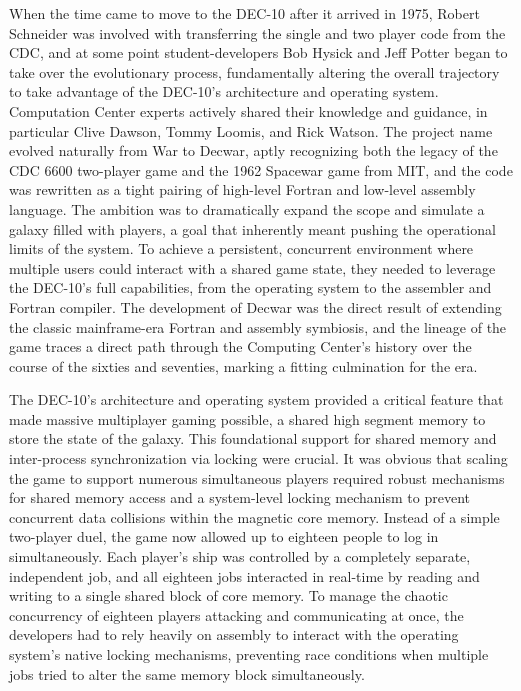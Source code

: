 When the time came to move to the DEC-10 after it arrived in 1975, Robert Schneider was involved with transferring the single and two player code from the CDC, and at some point student-developers Bob Hysick and Jeff Potter began to take over the evolutionary process, fundamentally altering the overall trajectory to take advantage of the DEC-10's architecture and operating system. Computation Center experts actively shared their knowledge and guidance, in particular Clive Dawson, Tommy Loomis, and Rick Watson. The project name evolved naturally from War to Decwar, aptly recognizing both the legacy of the CDC 6600 two-player game and the 1962 Spacewar game from MIT, and the code was rewritten as a tight pairing of high-level Fortran and low-level assembly language. The ambition was to dramatically expand the scope and simulate a galaxy filled with players, a goal that inherently meant pushing the operational limits of the system. To achieve a persistent, concurrent environment where multiple users could interact with a shared game state, they needed to leverage the DEC-10’s full capabilities, from the operating system to the assembler and Fortran compiler. The development of Decwar was the direct result of extending the classic mainframe-era Fortran and assembly symbiosis, and the lineage of the game traces a direct path through the Computing Center’s history over the course of the sixties and seventies, marking a fitting culmination for the era. 

The DEC-10's architecture and operating system provided a critical feature that made massive multiplayer gaming possible, a shared high segment memory to store the state of the galaxy. This foundational support for shared memory and inter-process synchronization via locking were crucial. It was obvious that scaling the game to support numerous simultaneous players required robust mechanisms for shared memory access and a system-level locking mechanism to prevent concurrent data collisions within the magnetic core memory. Instead of a simple two-player duel, the game now allowed up to eighteen people to log in simultaneously. Each player's ship was controlled by a completely separate, independent job, and all eighteen jobs interacted in real-time by reading and writing to a single shared block of core memory. To manage the chaotic concurrency of eighteen players attacking and communicating at once, the developers had to rely heavily on assembly to interact with the operating system's native locking mechanisms, preventing race conditions when multiple jobs tried to alter the same memory block simultaneously. 

